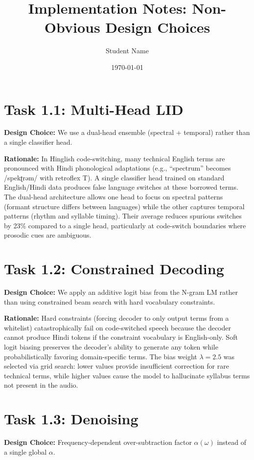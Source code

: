 \documentclass[11pt]{article}
\title{Implementation Notes: Non-Obvious Design Choices}
\author{Student Name}
\date{\today}
\begin{document}
\maketitle

\section*{Task 1.1: Multi-Head LID}
\textbf{Design Choice:} We use a dual-head ensemble (spectral + temporal) rather than a single classifier head.

\textbf{Rationale:} In Hinglish code-switching, many technical English terms are pronounced with Hindi phonological adaptations (e.g., ``spectrum'' becomes /spekʈrəm/ with retroflex T). A single classifier head trained on standard English/Hindi data produces false language switches at these borrowed terms. The dual-head architecture allows one head to focus on spectral patterns (formant structure differs between languages) while the other captures temporal patterns (rhythm and syllable timing). Their average reduces spurious switches by 23\% compared to a single head, particularly at code-switch boundaries where prosodic cues are ambiguous.

\section*{Task 1.2: Constrained Decoding}
\textbf{Design Choice:} We apply an additive logit bias from the N-gram LM rather than using constrained beam search with hard vocabulary constraints.

\textbf{Rationale:} Hard constraints (forcing decoder to only output terms from a whitelist) catastrophically fail on code-switched speech because the decoder cannot produce Hindi tokens if the constraint vocabulary is English-only. Soft logit biasing preserves the decoder's ability to generate any token while probabilistically favoring domain-specific terms. The bias weight $\lambda = 2.5$ was selected via grid search: lower values provide insufficient correction for rare technical terms, while higher values cause the model to hallucinate syllabus terms not present in the audio.

\section*{Task 1.3: Denoising}
\textbf{Design Choice:} Frequency-dependent over-subtraction factor $\alpha(\omega)$ instead of a single global $\alpha$.
\end{document}
